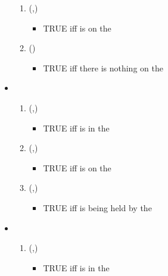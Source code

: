 \begin{itemize}
\begin{enumerate}[resume]
    \item {}(,)
        \begin{itemize}
            \item TRUE iff  is on the 
        \end{itemize}
  
    \item {}()
        \begin{itemize}
            \item TRUE iff there is nothing on the 
        \end{itemize}
  
  \end{enumerate}

\item {}
    \begin{enumerate}[resume]
        \item {}(,)
            \begin{itemize}
                \item TRUE iff  is in the 
            \end{itemize}
  
        \item {}(,)
            \begin{itemize}
                \item TRUE iff  is on the 
            \end{itemize}
  
        \item {}(,)
            \begin{itemize}
                \item TRUE iff  is being held by the 	
            \end{itemize}
    \end{enumerate}

\item {}
    \begin{enumerate}[resume]
        \item {}(,)
            \begin{itemize}
                \item TRUE iff  is in the 	
            \end{itemize}
  

\end{enumerate}
\end{itemize}
